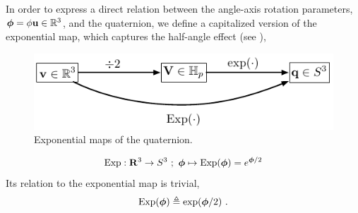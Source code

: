 In order to express a direct relation between the angle-axis rotation parameters, ${\bm \phi}=\phi{\bf u}\in{\mathbb R}^3$, and the quaternion, we define a capitalized version of the exponential map, which captures the half-angle effect (see ),
%
\begin{figure}[tb]
\begin{center}
\includegraphics{figures/exp_map_q}
\caption{Exponential maps of the quaternion.}
\label{fig:exp_map_q}
\end{center}
\end{figure}
%
\begin{align}
\operatorname*{Exp}:{\bf R}^3\to S^3~;~{\bm \phi}\mapsto\operatorname*{Exp}({\bm \phi})=e^{{\bm \phi}/2}
\end{align}
%
Its relation to the exponential map is trivial,
%
\begin{align}
\operatorname*{Exp}({\bm \phi}) \triangleq \exp({\bm \phi}/2)
~.
\end{align}


